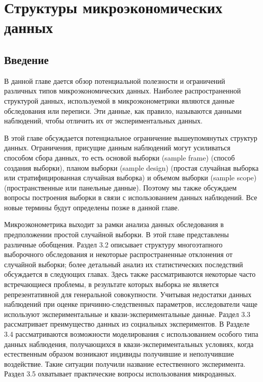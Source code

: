 

\chapter{Структуры микроэкономических данных}

\section{Введение}

В данной главе дается обзор потенциальной полезности и ограничений различных типов микроэкономических данных. Наиболее распространенной структурой данных, используемой в микроэконометрики являются данные обследования или переписи. Эти данные, как правило, называются данными наблюдений, чтобы отличить их от экспериментальных данных.


В этой главе обсуждается потенциальное ограничение вышеупомянутых структур данных. Ограничения, присущие данным наблюдений могут усиливаться способом сбора данных, то есть основой выборки (sample frame) (способ создания выборки), планом выборки (sample design) (простая случайная выборка или стратифицированная случайная выборка) и объемом выборки (sample scope) (пространственные или панельные данные). Поэтому мы также обсуждаем вопросы построения выборки в связи с использованием данных наблюдений. Все новые термины будут определены позже в данной главе.
	
	
Микроэконометрика выходит за рамки анализа данных обследования в предположении простой случайной выборки. В этой главе представлены различные обобщения. Раздел 3.2 описывает структуру многоэтапного выборочного обследования и некоторые распространенные отклонения от случайной выборки; более детальный анализ их статистических последствий обсуждается в следующих главах. Здесь также рассматриваются некоторые часто встречающиеся проблемы, в результате которых выборка не является репрезентативной для генеральной совокупности. Учитывая недостатки данных наблюдений при оценке причинно-следственных параметров, исследователи чаще используют экспериментальные и квази-экспериментальные данные. Раздел 3.3 рассматривает преимущество данных из социальных экспериментов. В Разделе 3.4 рассматриваются возможности моделирования с использованием особого типа данных наблюдения, получающихся в квази-экспериментальных условиях, когда естественным образом возникают индивиды получившие и неполучившие воздействие. Такие ситуации получили название естественного эксперимента. Раздел 3.5 охватывает практические вопросы использования микроданных.
	
